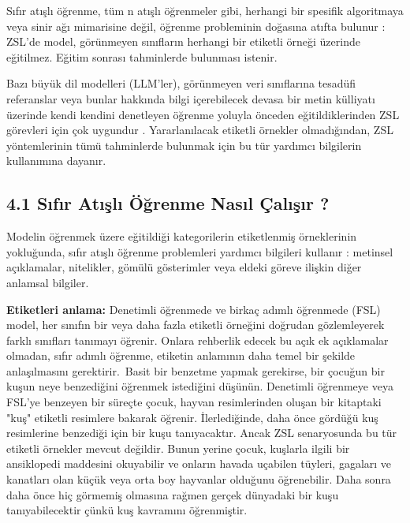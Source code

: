 \documentclass[10pt,a4paper]{report}
\begin{document}
	
	\raggedright Sıfır atışlı öğrenme, tüm n atışlı öğrenmeler gibi, herhangi bir spesifik algoritmaya veya sinir ağı mimarisine değil, öğrenme probleminin doğasına atıfta bulunur : ZSL'de model, görünmeyen sınıfların herhangi bir etiketli örneği üzerinde eğitilmez. Eğitim sonrası tahminlerde bulunması istenir.\newline
	
	Bazı büyük dil modelleri (LLM'ler), görünmeyen veri sınıflarına tesadüfi referanslar veya bunlar hakkında bilgi içerebilecek devasa bir metin külliyatı üzerinde kendi kendini denetleyen öğrenme yoluyla önceden eğitildiklerinden ZSL görevleri için çok uygundur . Yararlanılacak etiketli örnekler olmadığından, ZSL yöntemlerinin tümü tahminlerde bulunmak için bu tür yardımcı bilgilerin kullanımına dayanır.
	\subsection*{4.1 Sıfır Atışlı Öğrenme Nasıl Çalışır ?}
	
	Modelin öğrenmek üzere eğitildiği kategorilerin etiketlenmiş örneklerinin yokluğunda, sıfır atışlı öğrenme problemleri yardımcı bilgileri kullanır : metinsel açıklamalar, nitelikler, gömülü gösterimler veya eldeki göreve ilişkin diğer anlamsal bilgiler.\newline
	
	\textbf{Etiketleri anlama:}\newline
	Denetimli öğrenmede ve birkaç adımlı öğrenmede (FSL) model, her sınıfın bir veya daha fazla etiketli örneğini doğrudan gözlemleyerek farklı sınıfları tanımayı öğrenir. Onlara rehberlik edecek bu açık ek açıklamalar olmadan, sıfır adımlı öğrenme, etiketin anlamının daha temel bir şekilde anlaşılmasını gerektirir. \newline
	\clearpage
	Basit bir benzetme yapmak gerekirse, bir çocuğun bir kuşun neye benzediğini öğrenmek istediğini düşünün. Denetimli öğrenmeye veya FSL'ye benzeyen bir süreçte çocuk, hayvan resimlerinden oluşan bir kitaptaki "kuş" etiketli resimlere bakarak öğrenir. İlerlediğinde, daha önce gördüğü kuş resimlerine benzediği için bir kuşu tanıyacaktır. Ancak ZSL senaryosunda bu tür etiketli örnekler mevcut değildir. Bunun yerine çocuk, kuşlarla ilgili bir ansiklopedi maddesini okuyabilir ve onların havada uçabilen tüyleri, gagaları ve kanatları olan küçük veya orta boy hayvanlar olduğunu öğrenebilir. Daha sonra daha önce hiç görmemiş olmasına rağmen gerçek dünyadaki bir kuşu tanıyabilecektir çünkü kuş kavramını öğrenmiştir.\newline
	
\end{document}
